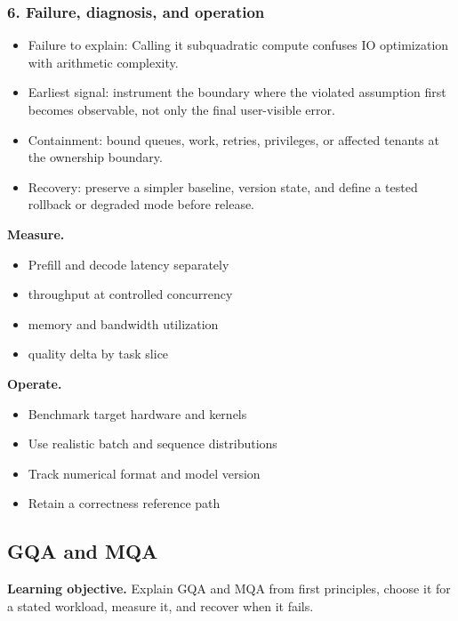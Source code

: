 \subsubsection*{6. Failure, diagnosis, and operation}
\begin{itemize}
\item Failure to explain: Calling it subquadratic compute confuses IO optimization with arithmetic complexity.
\item Earliest signal: instrument the boundary where the violated assumption first becomes observable, not only the final user-visible error.
\item Containment: bound queues, work, retries, privileges, or affected tenants at the ownership boundary.
\item Recovery: preserve a simpler baseline, version state, and define a tested rollback or degraded mode before release.
\end{itemize}
\textbf{Measure.}\begin{itemize}
\item Prefill and decode latency separately
\item throughput at controlled concurrency
\item memory and bandwidth utilization
\item quality delta by task slice
\end{itemize}
\textbf{Operate.}\begin{itemize}
\item Benchmark target hardware and kernels
\item Use realistic batch and sequence distributions
\item Track numerical format and model version
\item Retain a correctness reference path
\end{itemize}
\subsection{GQA and MQA}
\textbf{Learning objective.} Explain GQA and MQA from first principles, choose it for a stated workload, measure it, and recover when it fails.
